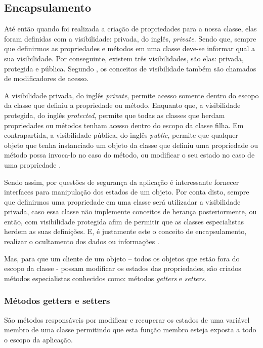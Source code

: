 \subsection{Encapsulamento}

Até então quando foi realizada a criação de propriedades para a nossa
classe, elas foram definidas com a visibilidade: privada, do inglês,
\textit{private}. Sendo que, sempre que definirmos as propriedades e métodos em
uma classe deve-se informar qual a  sua visibilidade. Por conseguinte, existem
três visibilidades, são elas: privada, protegida e pública. Segundo
, os conceitos de visibilidade também são
chamados de modificadores de acesso.

A visibilidade privada, do inglês \textit{private}, permite acesso somente
dentro do escopo da classe que definiu a propriedade ou método. Enquanto que, a
visibilidade protegida, do inglês \textit{protected}, permite que todas as
classes  que herdam propriedades ou métodos tenham acesso dentro do escopo da classe filha.
Em contrapartida, a visibilidade pública, do inglês \textit{public}, permite que
qualquer objeto que tenha instanciado um objeto da classe que definiu uma propriedade ou
método possa invoca-lo no caso do método, ou modificar o seu estado no caso de
uma propriedade \cite{learningJava}.

Sendo assim, por questões de segurança da aplicação é interessante fornecer
interfaces para manipulação dos estados de um objeto. Por conta disto,  sempre
que definirmos uma propriedade em uma classe será utilizadar a visibilidade
privada, caso essa classe não implemente conceitos de herança posteriormente,
ou então, com visibilidade protegida afim de permitir que as classes
especialistas  herdem as suas definições. E, é justamente este o conceito de
encapsulamento, realizar o ocultamento dos dados ou informações \cite{javaComoProgramar}.

Mas, para que um cliente de um objeto – todos os objetos que estão fora do
escopo da classe -  possam modificar os estados das propriedades, são criados
métodos especialistas conhecidos como: métodos \textit{getters} e \textit{setters}.

\subsubsection{Métodos getters e setters}

São métodos responsáveis por modificar e recuperar os estados de uma variável
membro de uma classe permitindo que esta função membro esteja exposta a todo o
escopo da aplicação.


